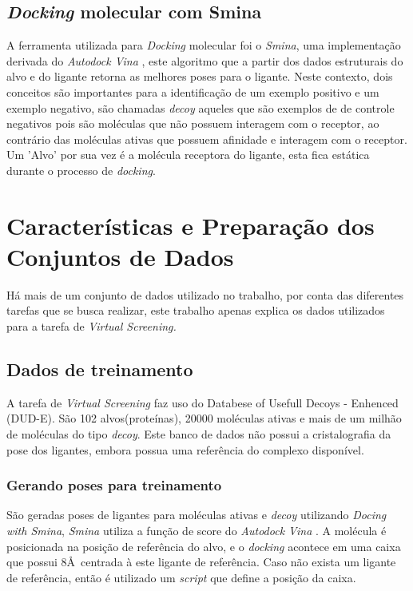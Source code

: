 \documentclass[utf8]{frontiersSCNS} %
\begin{document}
\subsection{\textit{Docking} molecular com Smina}

A ferramenta utilizada para \textit{Docking} molecular foi o \textit{Smina}\cite{smina}, uma implementação derivada do \textit{Autodock Vina} \cite{Trott2010AutoDockVina}, este algoritmo que a partir dos dados estruturais do alvo e do ligante retorna as melhores poses para o ligante. Neste contexto, dois conceitos são importantes para a identificação de um exemplo positivo e um exemplo negativo, são chamadas \textit{decoy} aqueles que são exemplos de de controle negativos pois são moléculas que não possuem interagem com o receptor, ao contrário das moléculas ativas que possuem afinidade e interagem com o receptor. Um 'Alvo' por sua vez é a molécula receptora do ligante, esta fica estática durante o processo de \textit{docking}.


\section{Características e Preparação dos Conjuntos de Dados} %
Há mais de um conjunto de dados utilizado no trabalho, por conta das diferentes tarefas que se busca realizar, este trabalho apenas explica os dados utilizados para a tarefa de \textit{Virtual Screening.}

\subsection{Dados de treinamento}

A tarefa de \textit{Virtual Screening} faz uso do Databese of Usefull Decoys - Enhenced (DUD-E)\cite{Mysinger2012DUDE}. São 102 alvos(proteínas), 20000 moléculas ativas e mais de um milhão de moléculas do tipo \textit{decoy}. Este banco de dados não possui a cristalografia da pose dos ligantes, embora possua uma referência do complexo disponível.

\subsubsection{Gerando poses para treinamento}

São geradas poses de ligantes para moléculas ativas e \textit{decoy} utilizando \textit{Docing with Smina}, \textit{Smina} utiliza a função de score do \textit{Autodock Vina }\cite{smina}. A molécula é posicionada na posição de referência do alvo, e o \textit{docking} acontece em uma caixa que possui 8\AA \  centrada à este ligante de referência. Caso não exista um ligante de referência, então é utilizado um \textit{script} que define a posição da caixa.
\end{document}
